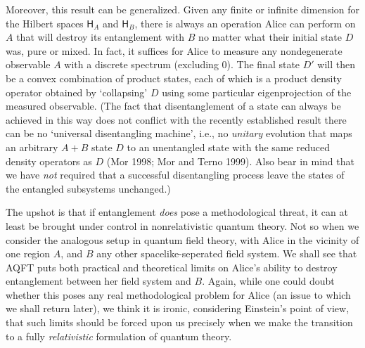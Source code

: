 \documentclass[12pt]{article}
\newcommand{\hil}[1]{\mbox{$\mathsf{#1}$}}
\begin{document}
Moreover, this result can be 
generalized.  Given any finite or infinite dimension for the Hilbert 
spaces $\hil{H}_{A}$ and $\hil{H}_{B}$, there is always an operation Alice can 
perform on $A$ that will destroy its entanglement with 
$B$ no matter what their initial state $D$ was, pure 
or mixed.
In fact, it suffices for Alice to measure any nondegenerate 
observable $A$ with a discrete spectrum (excluding $0$).  The final 
state $D'$ will then be a convex combination of product states, 
each of which is a product density operator obtained by `collapsing' 
$D$ using some particular eigenprojection of the measured 
observable.  (The fact that disentanglement of a state can always 
be achieved in this way does not conflict with the recently 
established result there can be no `universal disentangling machine', i.e., 
no \emph{unitary} evolution that maps an arbitrary 
$A+B$ state $D$ to an unentangled state with the same 
reduced density operators as $D$ (Mor 1998; Mor and Terno 
1999).  Also bear in mind that we have \emph{not} required that a 
successful disentangling process 
leave the states of the entangled subsystems unchanged.) 

The upshot is that if entanglement \emph{does} pose a methodological threat, 
it can at least be brought under control in nonrelativistic quantum 
theory.  Not so when we consider the analogous setup in quantum field theory,  with Alice 
in the vicinity of one region $A$, and $B$ any other spacelike-seperated 
field system.  We shall see that AQFT puts both practical and 
theoretical
limits on Alice's ability to destroy entanglement between her field system 
and $B$.  Again, while one could doubt whether this poses any real methodological 
problem for Alice (an issue to which we shall return later), 
we think it is ironic, considering Einstein's point of view,
that such limits should be forced upon us precisely when we make 
the transition to a fully \emph{relativistic} formulation of quantum 
theory.
\end{document}
